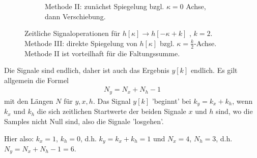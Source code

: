 \begin{figure*}[h]
\begin{subfigure}{0.7\textwidth}
\caption{Methode II: zunächst Spiegelung bzgl. $\kappa=0$ Achse, dann Verschiebung.}
\label{fig:FD58EEB1EC_MethodII}
\end{subfigure}
%
\caption{Zeitliche Signaloperationen für $h[\kappa] \rightarrow h[-\kappa+k]$ , $k=2$.
Methode III: direkte Spiegelung von $h[\kappa]$ bzgl. $\kappa=\frac{k}{2}$-Achse.
Methode II ist vorteilhaft für die Faltungssumme.}
\label{fig:FD58EEB1EC_Methods}
\end{figure*}
%
%
%
\begin{Ansatz}
Die Signale sind endlich, daher ist auch das Ergebnis $y[k]$ endlich.
Es gilt allgemein die Formel
\begin{align}
N_y = N_x + N_h-1
\end{align}
mit den Längen $N$ für $y,x,h$.
Das Signal $y[k]$ 'beginnt' bei $k_y=k_x+k_h$, wenn $k_x$ und $k_h$ die
sich zeitlichen Startwerte der beiden Signale $x$ und $h$ sind, wo die Samples
nicht Null sind, also die Signale 'losgehen'.

Hier also: $k_x=1$, $k_h = 0$, d.h. $k_y=k_x+k_h = 1$ und
$N_x = 4$, $N_h=3$, d.h. $N_y = N_x+N_h-1 = 6$.

\end{Ansatz}
